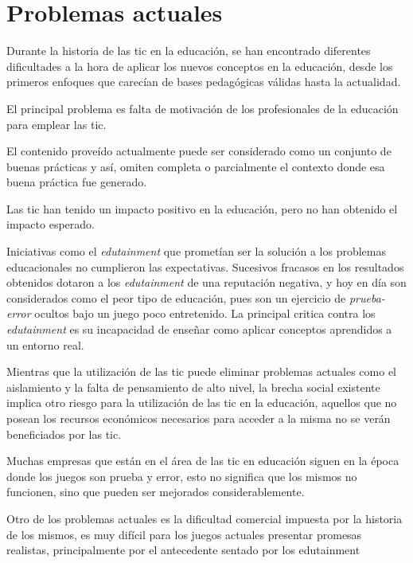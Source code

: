 \section{Problemas actuales}

Durante la historia de las \Gls{tic} en la educación, se han encontrado
diferentes dificultades a la hora de aplicar los nuevos conceptos en la
educación, desde los primeros enfoques que carecían de bases pedagógicas válidas
hasta la actualidad.

El principal problema es falta de motivación de los profesionales de la
educación para emplear las \Gls{tic}\cite{punie:ict}\cite{ict:romeo}.

El contenido proveído actualmente puede ser considerado como un conjunto de
buenas prácticas\cite{punie:ict} y así, omiten completa o parcialmente el
contexto donde esa buena práctica fue generado.

Las \Gls{tic} han tenido un impacto positivo en la educación\cite{punie:ict},
pero no han obtenido el impacto esperado.

Iniciativas como el \emph{edutainment} que prometían ser la solución a los
problemas educacionales no cumplieron las expectativas. Sucesivos fracasos en
los resultados obtenidos dotaron a los \emph{edutainment} de una reputación
negativa, y hoy en día son considerados como el peor tipo de educación, pues son
un ejercicio de \emph{prueba-error} ocultos bajo un juego poco
entretenido\cite{resnick:2004}. La principal critica contra los
\emph{edutainment} es su incapacidad de enseñar como aplicar conceptos
aprendidos a un entorno real\cite{resnick:2004}.

Mientras que la utilización de las \Gls{tic} puede eliminar problemas actuales
como el aislamiento y la falta de pensamiento de alto nivel\cite{punie:ict}, la
brecha social existente implica otro riesgo para la utilización de las \Gls{tic}
en la educación, aquellos que no posean los recursos económicos necesarios para
acceder a la misma no se verán beneficiados por las \Gls{tic}\cite{punie:ict}.

Muchas empresas que están en el área de las \Gls{tic} en educación siguen en la
época donde los juegos son prueba y error, esto no significa que los mismos no
funcionen, sino que pueden ser mejorados
considerablemente\cite{egenfeldt2007third}.

Otro de los problemas actuales es la dificultad comercial impuesta por la
historia de los mismos, es muy difícil para los juegos actuales presentar
promesas realistas, principalmente por el antecedente sentado por los
edutainment\cite{egenfeldt2007third}